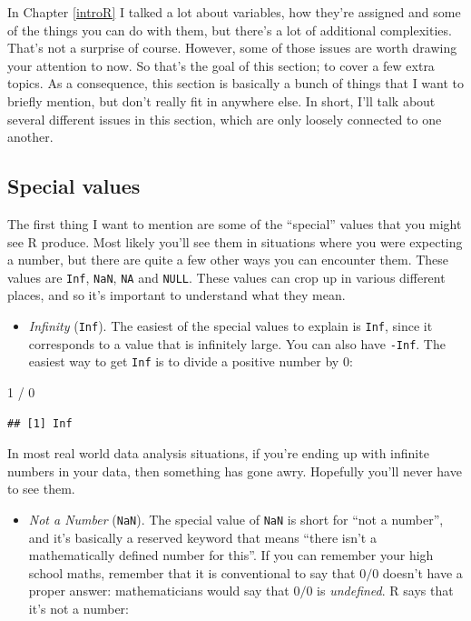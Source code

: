 \documentclass[
]{book}
\newenvironment{Shaded}{\begin{snugshade}}{\end{snugshade}}
\newcommand{\DecValTok}[1]{\textcolor[rgb]{0.00,0.00,0.81}{#1}}
\newcommand{\SpecialCharTok}[1]{\textcolor[rgb]{0.00,0.00,0.00}{#1}}
\providecommand{\tightlist}{%
  \setlength{\itemsep}{0pt}\setlength{\parskip}{0pt}}
\begin{document}
In Chapter \ref{introR} I talked a lot about variables, how they're assigned and some of the things you can do with them, but there's a lot of additional complexities. That's not a surprise of course. However, some of those issues are worth drawing your attention to now. So that's the goal of this section; to cover a few extra topics. As a consequence, this section is basically a bunch of things that I want to briefly mention, but don't really fit in anywhere else. In short, I'll talk about several different issues in this section, which are only loosely connected to one another.

\hypertarget{specials}{%
\subsection{Special values}\label{specials}}

The first thing I want to mention are some of the ``special'' values that you might see R produce. Most likely you'll see them in situations where you were expecting a number, but there are quite a few other ways you can encounter them. These values are \texttt{Inf}, \texttt{NaN}, \texttt{NA} and \texttt{NULL}. These values can crop up in various different places, and so it's important to understand what they mean.

\begin{itemize}
\tightlist
\item
  \emph{Infinity} (\texttt{Inf}). The easiest of the special values to explain is \texttt{Inf}, since it corresponds to a value that is infinitely large. You can also have \texttt{-Inf}. The easiest way to get \texttt{Inf} is to divide a positive number by 0:
\end{itemize}

\begin{Shaded}
\begin{Highlighting}[]
\DecValTok{1} \SpecialCharTok{/} \DecValTok{0}
\end{Highlighting}
\end{Shaded}

\begin{verbatim}
## [1] Inf
\end{verbatim}

In most real world data analysis situations, if you're ending up with infinite numbers in your data, then something has gone awry. Hopefully you'll never have to see them.

\begin{itemize}
\tightlist
\item
  \emph{Not a Number} (\texttt{NaN}). The special value of \texttt{NaN} is short for ``not a number'', and it's basically a reserved keyword that means ``there isn't a mathematically defined number for this''. If you can remember your high school maths, remember that it is conventional to say that \(0/0\) doesn't have a proper answer: mathematicians would say that \(0/0\) is \emph{undefined}. R says that it's not a number:
\end{itemize}
\end{document}
